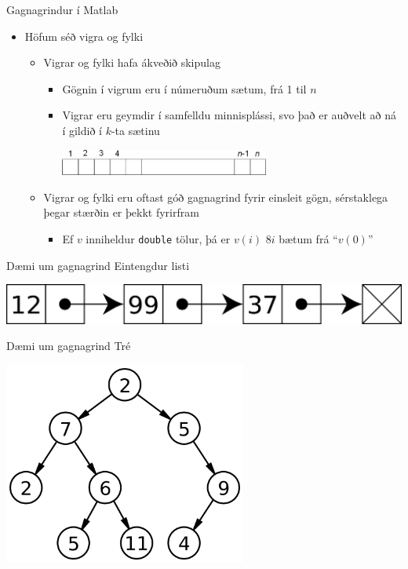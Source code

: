 \documentclass[handout]{beamer}
\begin{document}
\begin{frame}{Gagnagrindur í Matlab}
\begin{itemize}
 \item Höfum séð vigra og fylki
 \begin{itemize}
  \item Vigrar og fylki hafa ákveðið skipulag
  \begin{itemize}
   \item Gögnin í vigrum eru í númeruðum sætum, frá 1 til $n$
   \item Vigrar eru geymdir í samfelldu minnisplássi, svo það er auðvelt að ná í gildið í $k$-ta sætinu
\begin{center}
\includegraphics[width=0.6\textwidth]{Pics/vector-index}
\end{center}
   \end{itemize}
  \item Vigrar og fylki eru oftast góð gagnagrind fyrir einsleit gögn, sérstaklega þegar stærðin er þekkt fyrirfram
  \begin{itemize}
   \item Ef $v$ inniheldur \texttt{double} tölur, þá er $v(i)$ $8i$ bætum frá ``$v(0)$''
  \end{itemize}
 \end{itemize}
\end{itemize}
\end{frame}

\begin{frame}{Dæmi um gagnagrind}
Eintengdur listi
\begin{center}
\includegraphics[width=\textwidth]{Pics/singly-linked-list}
\end{center}
\end{frame}

\begin{frame}{Dæmi um gagnagrind}
\vspace{\baselineskip}
Tré
\begin{center}
\includegraphics[width=0.6\textwidth]{Pics/tree}
\end{center}
\end{frame}
\end{document}
